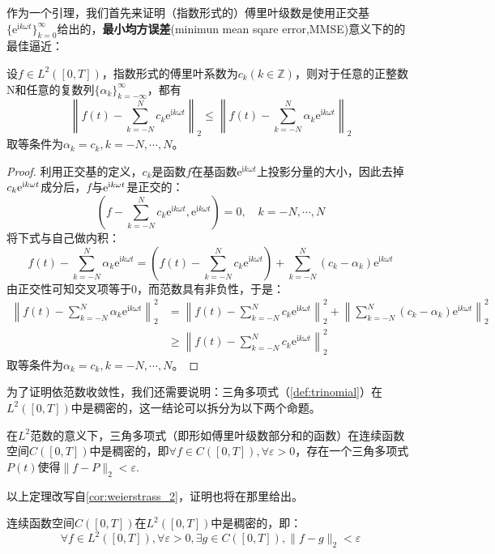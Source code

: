 作为一个引理，我们首先来证明（指数形式的）傅里叶级数是使用正交基$\{\mathrm{e}^{\mathrm{i}k\omega t}\}_{k=0}^{\infty}$给出的，\textbf{最小均方误差}(minimun mean sqare error,MMSE)意义下的的最佳逼近：
\begin{lemma}
    设$f\in L^2([0,T])$，指数形式的傅里叶系数为$c_k(k\in\mathbb{Z} )$，则对于任意的正整数N和任意的复数列$\{\alpha_k\}_{k=-\infty}^{\infty}$，都有
    \[\left\|f(t)-\sum_{k=-N}^{N}c_k \mathrm{e}^{\mathrm{i}k\omega t}\right\|_2\leq\left\|f(t)-\sum_{k=-N}^{N}\alpha_k \mathrm{e}^{\mathrm{i}k\omega t}\right\|_2\]
    取等条件为$\alpha_k=c_k,k=-N,\cdots,N$。
\end{lemma}
\begin{proof}
    利用正交基的定义，$c_k$是函数$f$在基函数$\mathrm{e}^{\mathrm{i}k\omega t}$上投影分量的大小，因此去掉$c_k\mathrm{e}^{\mathrm{i} k\omega t}$成分后，$f$与$\mathrm{e}^{\mathrm{i} k\omega t}$是正交的：
    \[\left(f-\sum_{k=-N}^{N}c_k \mathrm{e}^{\mathrm{i}k\omega t},\mathrm{e}^{\mathrm{i}k\omega t}\right)=0,\quad k=-N,\cdots,N\]
    将下式与自己做内积：
    \[f(t)-\sum_{k=-N}^{N}\alpha_k \mathrm{e}^{\mathrm{i}k\omega t}=\left(f(t)-\sum_{k=-N}^{N}c_k \mathrm{e}^{\mathrm{i}k\omega t}\right)+\sum_{k=-N}^{N}(c_k-\alpha_k) \mathrm{e}^{\mathrm{i}k\omega t}\]
    由正交性可知交叉项等于0，而范数具有非负性，于是：
    \begin{align*}
        \left\|f(t)-\sum_{k=-N}^{N}\alpha_k \mathrm{e}^{\mathrm{i}k\omega t}\right\|_2^2&=\left\|f(t)-\sum_{k=-N}^{N}c_k \mathrm{e}^{\mathrm{i}k\omega t}\right\|_2^2+\left\|\sum_{k=-N}^{N}(c_k-\alpha_k) \mathrm{e}^{\mathrm{i}k\omega t}\right\|_2^2\\
        &\geq \left\|f(t)-\sum_{k=-N}^{N}c_k \mathrm{e}^{\mathrm{i}k\omega t}\right\|_2^2
    \end{align*}
    取等条件为$\alpha_k=c_k,k=-N,\cdots,N$。
\end{proof}

为了证明依范数收敛性，我们还需要说明：三角多项式（\cref{def:trinomial}）在$L^2([0,T])$中是稠密的，这一结论可以拆分为以下两个命题。
\begin{theorem}[魏尔斯特拉斯第二逼近定理]
    在$L^2$范数的意义下，三角多项式（即形如傅里叶级数部分和的函数）在连续函数空间$C([0,T])$中是稠密的，即$\forall f\in C([0,T]),\forall \varepsilon >0$，存在一个三角多项式$P(t)$使得$\|f-P\|_2<\varepsilon$.
\end{theorem}
以上定理改写自\cref{cor:weierstrass_2}，证明也将在那里给出。

\begin{claim}
    连续函数空间$C([0,T])$在$L^2([0,T])$中是稠密的，即：
    $$\forall f\in L^2([0,T]),\forall\varepsilon >0,\exists g\in C([0,T]),\|f-g\|_2<\varepsilon$$
\end{claim}

